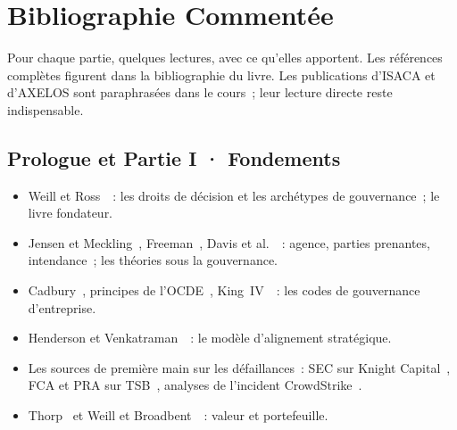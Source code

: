 
\chapter{Bibliographie Commentée}
\label{ann:biblio}

Pour chaque partie, quelques lectures, avec ce qu'elles apportent. Les
références complètes figurent dans la bibliographie du livre. Les
publications d'ISACA et d'AXELOS sont paraphrasées dans le cours~; leur
lecture directe reste indispensable.

\section*{Prologue et Partie I · Fondements}

\begin{itemize}
    \item Weill et Ross~\cite{weill2004itgovernance}~: les droits de décision
          et les archétypes de gouvernance~; le livre fondateur.
    \item Jensen et Meckling~\cite{jensen1976agency}, Freeman~\cite{freeman1984stakeholder},
          Davis et al.~\cite{davis1997stewardship}~: agence, parties
          prenantes, intendance~; les théories sous la gouvernance.
    \item Cadbury~\cite{cadbury1992}, principes de l'OCDE~\cite{oecd2023principles},
          King~IV~\cite{iod2016king4}~: les codes de gouvernance d'entreprise.
    \item Henderson et Venkatraman~\cite{henderson1993alignment}~: le modèle
          d'alignement stratégique.
    \item Les sources de première main sur les défaillances~: SEC sur Knight
          Capital~\cite{sec2013knight}, FCA et PRA sur TSB~\cite{fca2022tsb},
          analyses de l'incident CrowdStrike~\cite{crowdstrike2024rca,microsoft2024crowdstrike}.
    \item Thorp~\cite{thorp1998paradox} et Weill et Broadbent~\cite{weill1998infrastructure}~:
          valeur et portefeuille.
\end{itemize}

